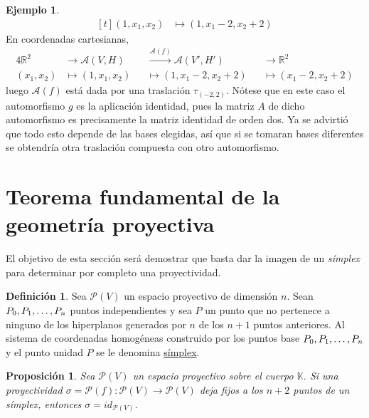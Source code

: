 \documentclass[12pt]{report}
\newtheorem{proposition}{Proposición}[chapter]
\theoremstyle{definition}
\newtheorem{definition}{Definición}[chapter]
\theoremstyle{definition}
\newtheorem{example}{Ejemplo}[chapter]
\theoremstyle{remark}
\newcommand{\R}{\mathbb R}
\begin{document}
\begin{example}
\[\begin{aligned}[t]
(1,x_1,x_2) &\longmapsto (1,x_1-2,x_2+2)
\end{aligned}
\]
En coordenadas cartesianas,
\begin{alignat*}{4}
\R^2 &\longrightarrow \mathcal{A}(V,H) &&\overset{\mathcal{A}(f)}{\longrightarrow} \mathcal{A}(V',H') &&\longrightarrow \R^2\\
(x_1,x_2) &\longmapsto (1,x_1,x_2) &&\longmapsto (1,x_1-2,x_2+2) &&\longmapsto (x_1-2,x_2+2)
\end{alignat*}
luego $\mathcal{A}(f)$ está dada por una traslación $\tau_{(-2,2)}$. Nótese que en este caso el automorfismo $g$ es la aplicación identidad, pues la matriz $A$ de dicho automorfismo es precisamente la matriz identidad de orden dos. Ya se advirtió que todo esto depende de las bases elegidas, así que si se tomaran bases diferentes se obtendría otra traslación compuesta con otro automorfismo.
\end{example}

\section{Teorema fundamental de la geometría proyectiva}

El objetivo de esta sección será demostrar que basta dar la imagen de un \textit{símplex} para determinar por completo una proyectividad.

\begin{definition}
    Sea $\mathcal{P}(V)$ un espacio proyectivo de dimensión $n$. Sean $P_0, P_1 , \mathellipsis, P_n$ puntos independientes y sea $P$ un punto que no pertenece a ninguno de los hiperplanos generados por $n$ de los $n+1$ puntos anteriores. Al sistema de coordenadas homogéneas construido por los puntos base $P_0,P_1,\mathellipsis,P_n$ y el punto unidad $P$ se le denomina \ul{símplex}.
\end{definition}

\begin{proposition}
    Sea $\mathcal{P}(V)$ un espacio proyectivo sobre el cuerpo $\mathbb{K}$. Si una proyectividad $\sigma = \mathcal{P}(f) \colon \mathcal{P}(V) \to \mathcal{P}(V)$ deja fijos a los $n+2$ puntos de un símplex, entonces $\sigma = id_{\mathcal{P}(V)}$.
\end{proposition}
\end{document}
